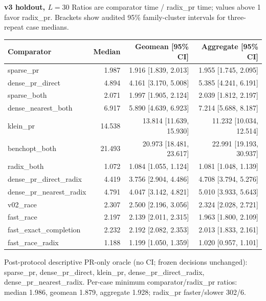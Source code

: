 \par\noindent\textbf{v3 holdout, $L=30$}
Ratios are comparator time / radix\_pr time; values above 1 favor radix\_pr.
Brackets show audited 95\% family-cluster intervals for three-repeat case medians.
\par\smallskip
\begin{tabular}{lrrr}
Comparator & Median & Geomean [95\% CI] & Aggregate [95\% CI] \\
\hline
sparse\_pr & 1.987 & 1.916 [1.839, 2.013] & 1.955 [1.745, 2.095] \\
dense\_pr\_direct & 4.894 & 4.161 [3.170, 5.008] & 5.385 [4.241, 6.191] \\
sparse\_both & 2.071 & 1.997 [1.905, 2.124] & 2.039 [1.812, 2.197] \\
dense\_nearest\_both & 6.917 & 5.890 [4.639, 6.923] & 7.214 [5.688, 8.187] \\
klein\_pr & 14.538 & 13.814 [11.639, 15.930] & 11.232 [10.034, 12.514] \\
benchopt\_both & 21.493 & 20.973 [18.481, 23.617] & 22.991 [19.193, 30.937] \\
radix\_both & 1.072 & 1.084 [1.055, 1.124] & 1.081 [1.048, 1.139] \\
dense\_pr\_direct\_radix & 4.419 & 3.756 [2.904, 4.486] & 4.708 [3.794, 5.276] \\
dense\_pr\_nearest\_radix & 4.791 & 4.047 [3.142, 4.821] & 5.010 [3.933, 5.643] \\
v02\_race & 2.307 & 2.500 [2.196, 3.056] & 2.324 [2.028, 2.721] \\
fast\_race & 2.197 & 2.139 [2.011, 2.315] & 1.963 [1.800, 2.109] \\
fast\_exact\_completion & 2.232 & 2.192 [2.082, 2.353] & 2.013 [1.833, 2.161] \\
fast\_race\_radix & 1.188 & 1.199 [1.050, 1.359] & 1.020 [0.957, 1.101] \\
\end{tabular}
\par\smallskip
Post-protocol descriptive PR-only oracle (no CI; frozen decisions unchanged): sparse\_pr, dense\_pr\_direct, klein\_pr, dense\_pr\_direct\_radix, dense\_pr\_nearest\_radix.
Per-case minimum comparator/radix\_pr ratios: median 1.986, geomean 1.879, aggregate 1.928; radix\_pr faster/slower 302/6.


